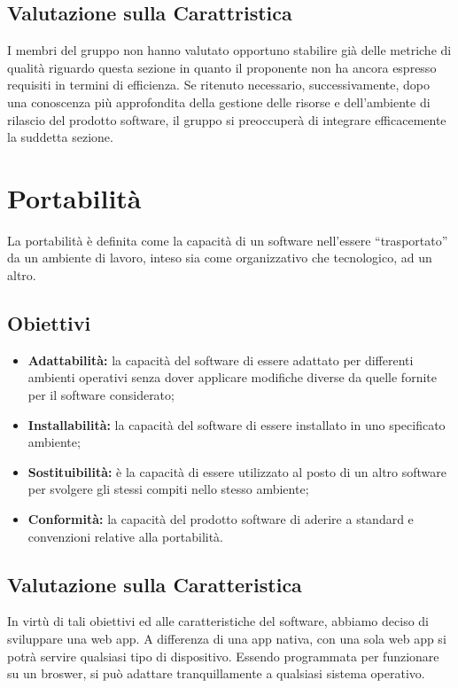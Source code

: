 \subsection{Valutazione sulla Carattristica} \label{3.4.1}
I membri del gruppo non hanno valutato opportuno stabilire già delle metriche di qualità riguardo questa sezione in quanto il proponente non ha ancora espresso requisiti in termini di efficienza. Se ritenuto necessario, successivamente, dopo una conoscenza più approfondita della gestione delle risorse e dell’ambiente di rilascio del prodotto software, il gruppo si preoccuperà di integrare efficacemente la suddetta sezione.

\section{Portabilità} \label{3.5}
La portabilità è definita come la capacità di un software nell’essere “trasportato” da un ambiente di lavoro, inteso sia come organizzativo che tecnologico,  ad un altro.
\subsection{Obiettivi}\label{3.5.1}
\begin{itemize}
	\item \textbf{Adattabilità:} la capacità del software di essere adattato per differenti ambienti operativi senza dover applicare 	modifiche diverse da quelle fornite per il software considerato;
	\item \textbf{Installabilità:} la capacità del software di essere installato in uno specificato ambiente;
	\item \textbf{Sostituibilità:} è la capacità di essere utilizzato al posto di un altro software per svolgere gli stessi compiti nello stesso ambiente;
	\item \textbf{Conformità:} la capacità del prodotto software di aderire a standard e convenzioni relative alla portabilità.
\end{itemize}
\subsection{Valutazione sulla Caratteristica} \label{3.5.2}
In virtù di tali obiettivi ed alle caratteristiche del software, abbiamo deciso di sviluppare una web app.
A differenza di una app nativa, con una sola web app si potrà servire qualsiasi tipo di dispositivo. 
Essendo programmata per funzionare su un broswer, si può adattare tranquillamente a qualsiasi sistema operativo.

